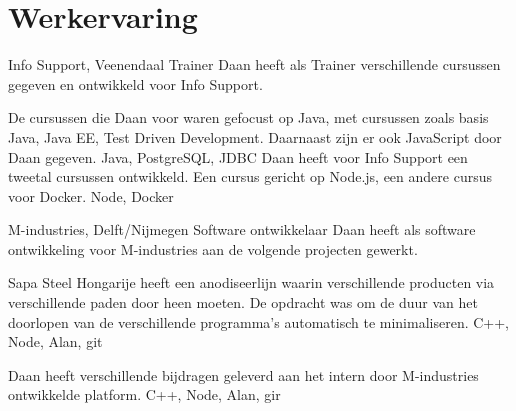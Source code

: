 \section*{Werkervaring}
  \begin{workExperience}{Info Support, Veenendaal}%
  {Trainer}{}
    Daan heeft als Trainer verschillende cursussen gegeven en ontwikkeld voor
    Info Support.

    De cursussen die Daan voor waren gefocust op Java, met cursussen zoals basis
    Java, Java EE, Test Driven Development. Daarnaast zijn er ook JavaScript
    door Daan gegeven.
    \technics Java, PostgreSQL, JDBC
    Daan heeft voor Info Support een tweetal cursussen ontwikkeld. Een cursus
    gericht op Node.js, een andere cursus voor Docker.
    \technics Node, Docker
  \end{workExperience}
	\begin{workExperience}{M-industries, Delft/Nijmegen}%
	{Software ontwikkelaar}{}
		Daan heeft als software ontwikkeling voor M-industries
                aan de volgende projecten gewerkt.

		Sapa Steel Hongarije heeft een anodiseerlijn waarin
                verschillende producten via verschillende paden door
                heen moeten.
		De opdracht was om de duur van het doorlopen van de
                verschillende programma's automatisch te
                minimaliseren.
                \technics C++, Node, Alan, git

		Daan heeft verschillende bijdragen geleverd aan het
                intern door M-industries ontwikkelde platform.
                \technics C++, Node, Alan, gir
	\end{workExperience}

